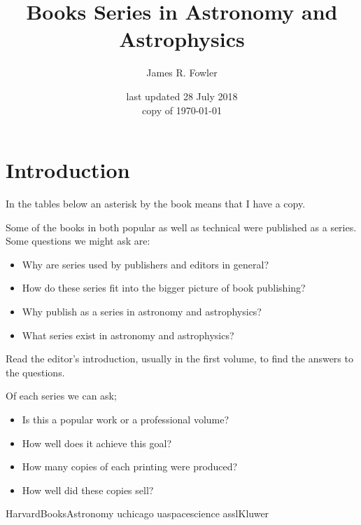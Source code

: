 \documentclass[letterpaper]{article}
\begin{document}
\title{Books Series in Astronomy and Astrophysics}
\author{James R. Fowler}
\date{last updated 28 July 2018\\ copy of \today}

  \maketitle

\tableofcontents
\listoftables


\section{Introduction}

In the tables below an asterisk by the book means that I have a copy.

Some of the books in  both popular as well as technical were published
as a series. Some questions we might ask are:

\begin{itemize}
  \item Why are series used by publishers and editors in general?
  \item How do these series fit into the bigger picture of book publishing?
  \item Why publish as a series in astronomy and astrophysics?
  \item What series exist in astronomy and astrophysics?
\end{itemize}

Read the editor's introduction, usually in the first volume, to
find the answers to the questions.
  
Of each series we can ask;

\begin{itemize}
  \item Is this a popular work or a professional volume?
  \item How well does it achieve this goal?
  \item How many copies of each printing were produced?
  \item How well did these copies sell?
\end{itemize}

{HarvardBooksAstronomy}
{uchicago}
{uaspacescience}
{asslKluwer}
\end{document}
